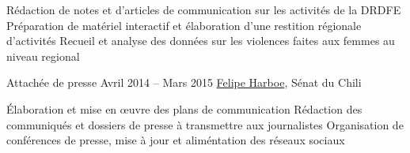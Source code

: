 \begin{joblist}
{		\iftbftiny \setlength{\parskip}{-10pt} \fi
		\begin{itemize}
			  \iftbftiny \setlength\itemsep{-3pt} \fi
			  \cvitem[\checkmark] Rédaction de notes et d'articles de communication sur les activités de la DRDFE      
			  \cvitem[\checkmark] Préparation de matériel interactif et élaboration d'une restition régionale d'activités
			  \cvitem[\checkmark] Recueil et analyse des données sur les violences faites aux femmes au niveau regional
		\end{itemize}      

	}



\item[Attachée de presse]{Avril 2014 -- Mars 2015}
     { \href{https://www.harboe.cl/}{Felipe Harboe}, Sénat du Chili } 
	 {
                
			\iftbftiny \setlength{\parskip}{-10pt} \fi
			\begin{itemize}
			  \iftbftiny \setlength\itemsep{-3pt} \fi
			  \cvitem[\checkmark] Élaboration et mise en œuvre des plans de communication
			  \cvitem[\checkmark] Rédaction des communiqués et dossiers de presse à transmettre aux journalistes
			  \cvitem[\checkmark] Organisation de conférences de presse, mise à jour et aliméntation des réseaux sociaux
			\end{itemize}     
			
	}
    

\end{joblist}
